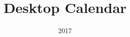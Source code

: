 \documentclass[table]{beamer}
\title[Sujit]{{\color{mymaroon} \setlength{\fboxrule}{2pt} } \\ Desktop Calendar \\ \vspace*{-2cm}}
\author{}
\institute{}
\date{\Huge{2017}}
\begin{document}
\beamertemplatenavigationsymbolsempty
\maketitle

\newcommand{\highlight}[1]{{\color{Red}(#1)}}
\newcommand{\comment}[1]{\begin{tiny}
{\color{blue}(#1)}
\end{tiny}}
\newcommand{\myheader}[1]{
	{\color{mymaroon}
		\begin{Large}
			\begin{center}
				{#1}
			\end{center}
		\end{Large}
	}
}

\newcommand{\myminorheader}[1]{
	{\color{purple}
		\begin{large}
			{#1}
		\end{large}
	}
}

\newcommand{\monthcolour}{myindigo}
\newcommand{\headercolour}{yellow!25}
\newcommand{\phbordercolour}{mymaroon}
\newcommand{\workingdaycolour}{black}
\newcommand{\holidaycolour}{red}
\newcommand{\weekendcolour}{mymaroon}

\fboxsep=2pt%
\fboxrule=2pt%
\end{document}
